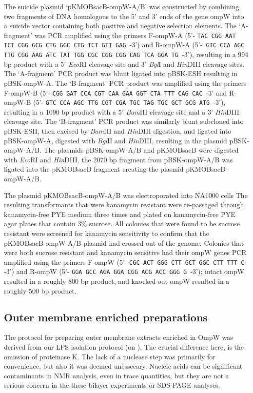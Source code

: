 The suicide plasmid `pKMOBsacB-ompW-A/B' was constructed by combining two fragments of DNA homologous to the 5' and 3' ends of the gene ompW into a suicide vector containing both positive and negative selection elements. The `A-fragment' was \ac{PCR} amplified using the primers F-ompW-A (5'- \texttt{TAC CGG AAT TCT CGG GCG CTG GGC CTG TCT GTT GAG }-3') and R-ompW-A (5'-\texttt{ GTC CCA AGC TTG CGG AAG ATC TAT TGG CGC CGG CGG CAG TCA GGA TG }-3'), resulting in a 994 bp product with a 5' \textit{Eco}RI cleavage site and  3' \textit{Bgl}I and \textit{Hin}DIII cleavage sites.  The `A-fragment' \ac{PCR} product was blunt ligated into pBSK-ESH resulting in pBSK-ompW-A. The `B-fragment' PCR product was amplified using the primers F-ompW-B (5'- \texttt{CGG GAT CCA CGT CAA GAA GGT CTA TTT CAG CAC }-3' and R-ompW-B (5'- \texttt{GTC CCA AGC TTG CGT CGA TGC TAG TGC GCT GCG ATG }-3'), resulting in a 1090 bp product with a 5' \textit{Bam}HI cleavage site and a 3' \textit{Hin}DIII cleavage site. The `B-fragment' \ac{PCR} product was similarly blunt subcloned into pBSK-ESH, then excised by \textit{Bam}HI and \textit{Hin}DIII digestion, and ligated into pBSK-ompW-A, digested with \textit{Bgl}II and \textit{Hin}DIII, resulting in the plasmid pBSK-ompW-A/B. The plasmids pBSK-ompW-A/B and pKMOBsacB were digested with \textit{Eco}RI and \textit{Hin}DIII, the 2070 bp fragment from pBSK-ompW-A/B was ligated into the pKMOBsacB fragment creating the plasmid pKMOBsacB-ompW-A/B.

The plasmid pKMOBsacB-ompW-A/B was electroporated into \caulobacter NA1000 cells The resulting transformants that were kanamycin resistant were re-passaged through kanamycin-free \ac{PYE} medium three times and plated on kanamycin-free \ac{PYE} agar plates that contain 3\% sucrose. All colonies that were found to be sucrose resistant were screened for kanamycin sensitivity to confirm that the pKMOBsacB-ompW-A/B plasmid had crossed out of the genome. Colonies that were both sucrose resistant and kanamycin sensitive had their ompW genes \ac{PCR} amplified using the primers F-ompW (5'- \texttt{CGC ACT GGG CTT GCT GGC CTT TTT C }-3') and R-ompW (5'- \texttt{GGA GCC AGA GGA CGG ACG ACC GGG G }-3'); intact ompW resulted in a roughly 800 bp product, and knocked-out ompW resulted in a roughly 500 bp product.


\subsection{Outer membrane enriched preparations}
\label{sub:porin_omp_prep}
The protocol for preparing outer membrane extracts enriched in OmpW was derived from our \ac{LPS} isolation protocol (on ). The crucial difference here, is the omission of proteinase K. The lack of a nuclease step was primarily for convenience, but also it was deemed unessecary. Nucleic acids can be significant contaminants in \ac{NMR} analysis, even in trace quantities, but they are not a serious concern in the these bilayer  experiments or \ac{SDS-PAGE} analyses.

